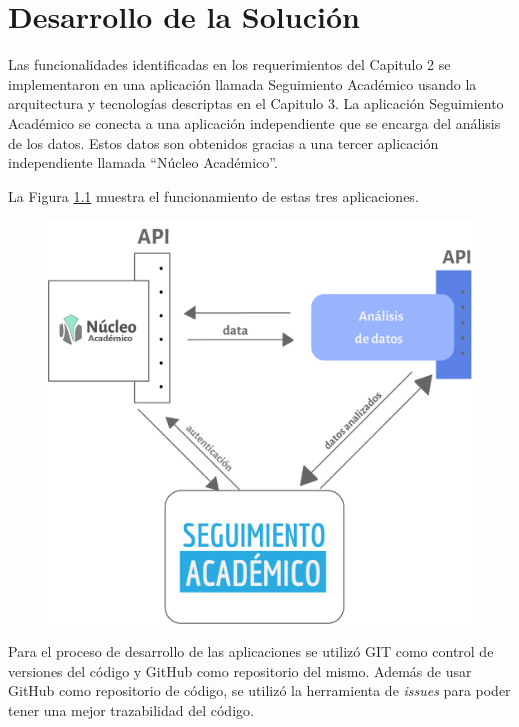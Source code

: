\chapter{Desarrollo de la Solución}
\label{sec:desarrollo}

Las funcionalidades identificadas en los requerimientos del Capitulo 2 se implementaron en una aplicación llamada Seguimiento Académico usando la arquitectura y tecnologías descriptas en el Capitulo 3.
La aplicación Seguimiento Académico se conecta a una aplicación independiente que se encarga del análisis de los datos. Estos datos son obtenidos gracias a una tercer aplicación independiente llamada “Núcleo Académico”.

La Figura \ref{fig:analisis-datos} muestra el funcionamiento de estas tres aplicaciones.


\begin{figure}[H]
  \centering
    \includegraphics[scale=0.8]{images/seguimiento-academico/flow-seguimiento-academico.png}
  \label{fig:analisis-datos}
\end{figure}

Para el proceso de desarrollo de las aplicaciones se utilizó GIT como control de versiones del código y GitHub como repositorio del mismo. Además de usar GitHub como repositorio de código, se utilizó la herramienta de \textit{issues} para poder tener una mejor trazabilidad del código.


